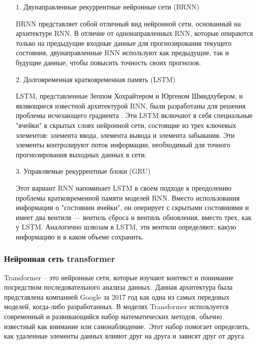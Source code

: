 \begin{itemize}[parsep=0.4em]
    \setlength\itemsep{0.8em plus 0.2em minus 0.2em}
    \item[1.] Двунаправленные рекуррентные нейронные сети (BRNN)

        BRNN представляет собой отличный вид нейронной сети, основанный на архитектуре RNN. В отличие от однонаправленных RNN, которые опираются только на предыдущие входные данные для прогнозирования текущего состояния, двунаправленные RNN используют как предыдущие, так и будущие данные, чтобы повысить точность своих прогнозов.

    \item[2.] Долговременная кратковременная память (LSTM)

        LSTM, представленные Зеппом Хохрайтером и Юргеном Шмидхубером, и являющиеся известной архитектурой RNN, были разработаны для решения проблемы исчезающего градиента \cite{bib:LSTM:1}. Эти LSTM включают в себя специальные "ячейки" в скрытых слоях нейронной сети, состоящие из трех ключевых элементов: элемента ввода, элемента вывода и элемента забывания. Эти элементы контролируют поток информации, необходимый для точного прогнозирования выходных данных в сети.
    
    \item[3.] Управляемые рекуррентные блоки (GRU)

        Этот вариант RNN напоминает LSTM в своем подходе к преодолению проблемы кратковременной памяти моделей RNN. Вместо использования информации о "состоянии ячейки", он оперирует с скрытыми состояниями и имеет два вентиля — вентиль сброса и вентиль обновления, вместо трех, как у LSTM. Аналогично шлюзам в LSTM, эти вентили определяют, какую информацию и в каком объеме сохранить.
\end{itemize}

\subsubsection{Нейронная сеть transformer}

Transformer – это нейронные сети, которые изучают контекст и понимание посредством последовательного анализа данных. Данная архитектура была представлена компанией Google за 2017 год как одна из самых передовых моделей, когда-либо разработанных. В моделях Transformer используется современный и развивающийся набор математических методов, обычно известный как внимание или самонаблюдение. Этот набор помогает определить, как удаленные элементы данных влияют друг на друга и зависят друг от друга.

